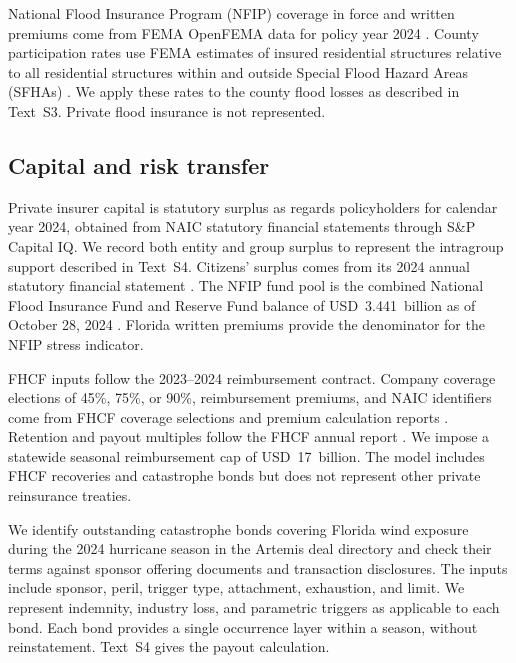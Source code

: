 National Flood Insurance Program (NFIP) coverage in force and written premiums come from FEMA OpenFEMA data for policy year 2024 \cite{fema_nfip_redacted_policies_v2_2024}. County participation rates use FEMA estimates of insured residential structures relative to all residential structures within and outside Special Flood Hazard Areas (SFHAs) \cite{fema_nfip_penetration_2025}. We apply these rates to the county flood losses as described in Text~S3. Private flood insurance is not represented.

\subsection*{Capital and risk transfer}
Private insurer capital is statutory surplus as regards policyholders for calendar year 2024, obtained from NAIC statutory financial statements through S\&P Capital IQ. We record both entity and group surplus to represent the intragroup support described in Text~S4. Citizens' surplus comes from its 2024 annual statutory financial statement \cite{citizens_annual_statement_2024}. The NFIP fund pool is the combined National Flood Insurance Fund and Reserve Fund balance of USD~3.441~billion as of October 28, 2024 \cite{crs_nfip_fund_balance_2025}. Florida written premiums provide the denominator for the NFIP stress indicator.

FHCF inputs follow the 2023--2024 reimbursement contract. Company coverage elections of 45\%, 75\%, or 90\%, reimbursement premiums, and NAIC identifiers come from FHCF coverage selections and premium calculation reports \cite{fhcf_coverage_2024}. Retention and payout multiples follow the FHCF annual report \cite{fhcf_annual_report_2023}. We impose a statewide seasonal reimbursement cap of USD~17~billion. The model includes FHCF recoveries and catastrophe bonds but does not represent other private reinsurance treaties.

We identify outstanding catastrophe bonds covering Florida wind exposure during the 2024 hurricane season in the Artemis deal directory \cite{artemis_catbond_2024} and check their terms against sponsor offering documents and transaction disclosures. The inputs include sponsor, peril, trigger type, attachment, exhaustion, and limit. We represent indemnity, industry loss, and parametric triggers as applicable to each bond. Each bond provides a single occurrence layer within a season, without reinstatement. Text~S4 gives the payout calculation.

